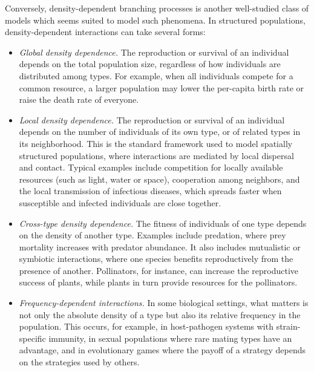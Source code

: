 Conversely, density-dependent branching processes
is another well-studied class of models which seems suited to model such
phenomena. 
In structured populations, density-dependent interactions can take several forms:
\begin{itemize}
\item \emph{Global density dependence.} The reproduction or survival of an individual depends on the total population size, regardless of how individuals are distributed among types. For example, when all individuals compete for a common resource, a larger population may lower the per-capita birth rate or raise the death rate of everyone.

\item \emph{Local density dependence.} The  reproduction or survival of an individual depends on the number of individuals of its own type, or of related types in its neighborhood. This is the standard framework used to model spatially structured populations, where interactions are mediated by local dispersal and contact. Typical examples include competition for locally available resources (such as light, water or space), cooperation among neighbors, and the local transmission of infectious diseases, which spreads faster when susceptible and infected individuals are close together.

\item \emph{Cross-type density dependence.} The fitness of individuals of one type depends on the density of another type. Examples include predation, where prey mortality increases with predator abundance. It also includes mutualistic or symbiotic interactions, where one species benefits reproductively from the presence of another. Pollinators, for instance, can increase the reproductive success of plants, while plants in turn provide resources for the pollinators.

\item \emph{Frequency-dependent interactions.} In some biological settings, what matters is not only the absolute density of a type but also its relative frequency in the population. This occurs, for example, in host-pathogen systems with strain-specific immunity, in sexual populations where rare mating types have an advantage, and in evolutionary games where the payoff of a strategy depends on the strategies used by others.
\end{itemize}

